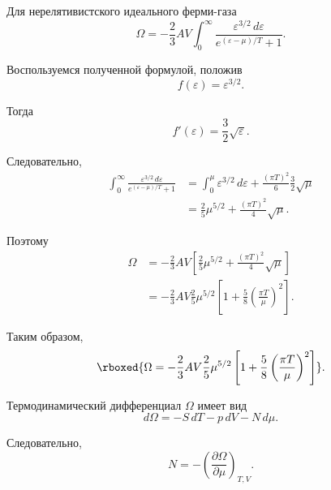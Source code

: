 \documentclass[../final.tex]{subfiles}
\begin{document}
Для нерелятивистского идеального ферми-газа
%
\begin{equation*}
    \Omega
    =
    -\frac{2}{3}AV
    \int_0^\infty
    \frac{
        \varepsilon^{3/2}\,d\varepsilon
    }{
        e^{(\varepsilon-\mu)/T}+1
    }.
\end{equation*}

Воспользуемся полученной формулой, положив
%
\begin{equation*}
    f(\varepsilon)
    =
    \varepsilon^{3/2}.
\end{equation*}

Тогда
%
\begin{equation*}
    f'(\varepsilon)
    =
    \frac{3}{2}
    \sqrt{\varepsilon}.
\end{equation*}

Следовательно,
%
\begin{align*}
    \int_0^\infty
    \frac{
        \varepsilon^{3/2}\,d\varepsilon
    }{
        e^{(\varepsilon-\mu)/T}+1
    }
    &=
    \int_0^\mu
    \varepsilon^{3/2}\,d\varepsilon
    +
    \frac{(\pi T)^2}{6}
    \frac{3}{2}
    \sqrt{\mu}
    \\[4pt]
    &=
    \frac{2}{5}
    \mu^{5/2}
    +
    \frac{(\pi T)^2}{4}
    \sqrt{\mu}.
\end{align*}

Поэтому
%
\begin{align*}
    \Omega
    &=
    -\frac{2}{3}AV
    \left[
        \frac{2}{5}\mu^{5/2}
        +
        \frac{(\pi T)^2}{4}
        \sqrt{\mu}
    \right]
    \\[6pt]
    &=
    -\frac{2}{3}AV
    \frac{2}{5}\mu^{5/2}
    \left[
        1
        +
        \frac{5}{8}
        \left(
            \frac{\pi T}{\mu}
        \right)^2
    \right].
\end{align*}

Таким образом,
%
\[
    \rboxed{
        \Omega
        =
        -\frac{2}{3}AV
        \frac{2}{5}\mu^{5/2}
        \left[
            1
            +
            \frac{5}{8}
            \left(
                \frac{\pi T}{\mu}
            \right)^2
        \right]
    }.
\]

Термодинамический дифференциал $\Omega$ имеет вид
%
\begin{equation*}
    d\Omega
    =
    -S\,dT
    -
    p\,dV
    -
    N\,d\mu.
\end{equation*}

Следовательно,
%
\begin{equation*}
    N
    =
    -
    \left(
        \frac{\partial\Omega}{\partial\mu}
    \right)_{T,V}.
\end{equation*}
\end{document}
